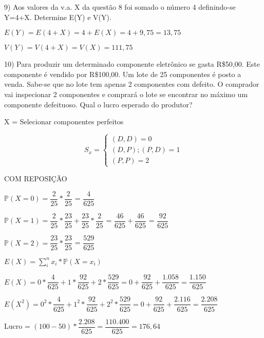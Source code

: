 \documentclass[12pt,a4paper]{article}
\begin{document}
\vspace{1cm}
9) Aos valores da v.a. X da questão 8 foi somado o número 4 definindo-se Y=4+X. Determine E(Y) e V(Y).

\begin{center}
	\vspace{0.25cm}
	$E(Y) = E(4 + X) = 4 + E(X) = 4 + 9,75 = 13,75$ 
	
	\vspace{1cm}
	$V(Y) = V(4 + X) = V(X) = 111,75$
\end{center}

\vspace{1cm}
10) Para produzir um determinado componente eletrônico se gasta R\$50,00. Este componente é vendido por R\$100,00. Um lote de 25 componentes é posto a venda. Sabe-se que no lote tem apenas 2 componentes com defeito. O comprador vai inspecionar 2 componentes e comprará o lote se encontrar no máximo um componente defeituoso. Qual o lucro esperado do produtor?

\begin{center}
	\vspace{0.25cm}
	X = Selecionar componentes perfeitos
	
	\[
	S_{x} =
	\begin{cases}
	(D,D) = 0 \\
	(D,P);(P,D) = 1\\
	(P,P) = 2
	\end{cases}
	\]
\end{center}

\vspace{0.25cm}
COM REPOSIÇÃO

\begin{center}	
	\vspace{0.5cm}
	$\mathbb{P}(X=0) = \dfrac{2}{25}*\dfrac{2}{25}$ = $\dfrac{4}{625}$
	
	\vspace{0.5cm}
	$\mathbb{P}(X=1) = \dfrac{2}{25}*\dfrac{23}{25} + \dfrac{23}{25}*\dfrac{2}{25}$ = $\dfrac{46}{625} + \dfrac{46}{625}$ = $\dfrac{92}{625}$
	
	\vspace{0.5cm}
	$\mathbb{P}(X=2) = \dfrac{23}{25}*\dfrac{23}{25}$ = $\dfrac{529}{625}$

	\vspace{1.5cm}
	$E(X) = \sum_{i}^{n} x_{i}*\mathbb{P}(X = x_{i})$

	\vspace{1cm}
	$E(X) = 0*\dfrac{4}{625}+1*\dfrac{92}{625}+2*\dfrac{529}{625} = 0 + \dfrac{92}{625} + \dfrac{1.058}{625} = \dfrac{1.150}{625}$

	\vspace{0.5cm}
	$E(X^{2}) = 0^{2}*\dfrac{4}{625}+1^{2}*\dfrac{92}{625}+2^{2}*\dfrac{529}{625} = 0 + \dfrac{92}{625} + \dfrac{2.116}{625} = \dfrac{2.208}{625}$

	\vspace{1cm}
	Lucro = $(100 - 50)*\dfrac{2.208}{625} = \dfrac{110.400}{625} = 176,64$
\end{center}
\end{document}
